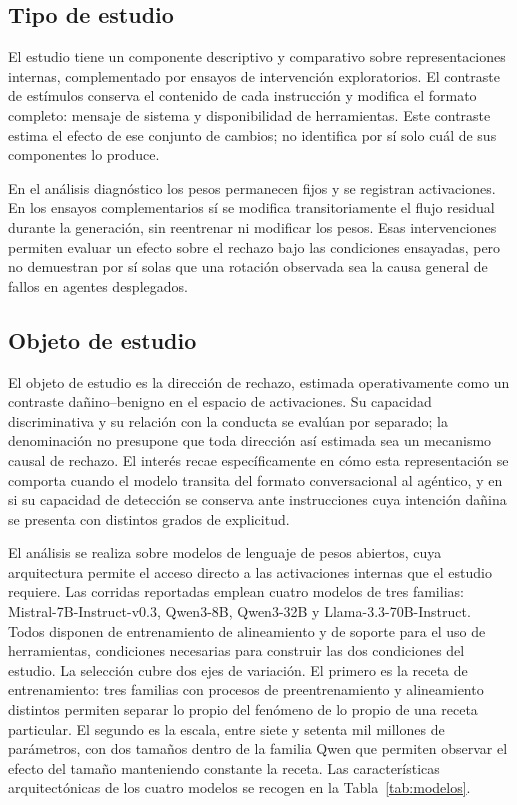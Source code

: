 \subsection{Tipo de estudio}

El estudio tiene un componente descriptivo y comparativo sobre representaciones internas, complementado por ensayos de intervención exploratorios. El contraste de estímulos conserva el contenido de cada instrucción y modifica el formato completo: mensaje de sistema y disponibilidad de herramientas. Este contraste estima el efecto de ese conjunto de cambios; no identifica por sí solo cuál de sus componentes lo produce.

En el análisis diagnóstico los pesos permanecen fijos y se registran activaciones. En los ensayos complementarios sí se modifica transitoriamente el flujo residual durante la generación, sin reentrenar ni modificar los pesos. Esas intervenciones permiten evaluar un efecto sobre el rechazo bajo las condiciones ensayadas, pero no demuestran por sí solas que una rotación observada sea la causa general de fallos en agentes desplegados.

\subsection{Objeto de estudio}

El objeto de estudio es la dirección de rechazo, estimada operativamente como un contraste dañino--benigno en el espacio de activaciones. Su capacidad discriminativa y su relación con la conducta se evalúan por separado; la denominación no presupone que toda dirección así estimada sea un mecanismo causal de rechazo. El interés recae específicamente en cómo esta representación se comporta cuando el modelo transita del formato conversacional al agéntico, y en si su capacidad de detección se conserva ante instrucciones cuya intención dañina se presenta con distintos grados de explicitud.

El análisis se realiza sobre modelos de lenguaje de pesos abiertos, cuya arquitectura permite el acceso directo a las activaciones internas que el estudio requiere. Las corridas reportadas emplean cuatro modelos de tres familias: Mistral-7B-Instruct-v0.3, Qwen3-8B, Qwen3-32B y Llama-3.3-70B-Instruct. Todos disponen de entrenamiento de alineamiento y de soporte para el uso de herramientas, condiciones necesarias para construir las dos condiciones del estudio. La selección cubre dos ejes de variación. El primero es la receta de entrenamiento: tres familias con procesos de preentrenamiento y alineamiento distintos permiten separar lo propio del fenómeno de lo propio de una receta particular. El segundo es la escala, entre siete y setenta mil millones de parámetros, con dos tamaños dentro de la familia Qwen que permiten observar el efecto del tamaño manteniendo constante la receta. Las características arquitectónicas de los cuatro modelos se recogen en la Tabla~\ref{tab:modelos}.

